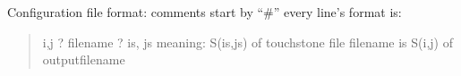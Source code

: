 \documentclass[letterpaper,10pt,english]{sphinxmanual}
\begin{document}
\begin{fulllineitems}
\label{\detokenize{touchstone:touchstone.generate_multiport_spfile}}
Configuration file format:
\sphinxhyphen{} comments start by “\#”
\sphinxhyphen{} every line’s format is:
\begin{quote}

i,j ? filename ? is, js
meaning:
S(is,js) of touchstone file filename is S(i,j) of outputfilename
\end{quote}

\end{fulllineitems}


\begin{fulllineitems}
\label{\detokenize{touchstone:touchstone.parseformat}}
\end{fulllineitems}

\end{document}
